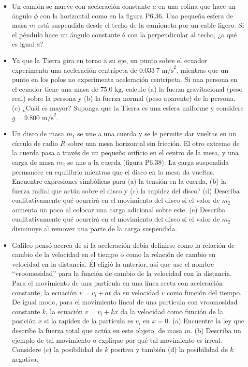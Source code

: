 \documentclass[11pt,a4paper]{article}
\begin{document}
\begin{itemize}
    \item[\textbf{36.}] Un camión se mueve con aceleración constante $a$ en una colina que hace un ángulo $\phi$ con la horizontal como en la figura P6.36. Una pequeña esfera de masa $m$ está suspendida desde el techo de la camioneta por un cable ligero. Si el péndulo hace un ángulo constante $\theta$ con la perpendicular al techo, ¿a qué es igual $a$?
    \vspace*{6cm}

    \item[\textbf{37.}] Ya que la Tierra gira en torno a su eje, un punto sobre el ecuador experimenta una aceleración centrípeta de $0.033\ 7 \text{ m/s}^2$, mientras que un punto en los polos no experimenta aceleración centrípeta. Si una persona en el ecuador tiene una masa de $75.0 \text{ kg}$, calcule (a) la fuerza gravitacional (peso real) sobre la persona y (b) la fuerza normal (peso aparente) de la persona. (c) ¿Cuál es mayor? Suponga que la Tierra es una esfera uniforme y considere $g = 9.800 \text{ m/s}^2$.
    \vspace*{7cm}

    \item[\textbf{38.}] Un disco de masa $m_1$ se une a una cuerda y se le permite dar vueltas en un círculo de radio $R$ sobre una mesa horizontal sin fricción. El otro extremo de la cuerda pasa a través de un pequeño orificio en el centro de la mesa, y una carga de masa $m_2$ se une a la cuerda (figura P6.38). La carga suspendida permanece en equilibrio mientras que el disco en la mesa da vueltas. Encuentre expresiones simbólicas para (a) la tensión en la cuerda, (b) la fuerza radial que actúa sobre el disco y (c) la rapidez del disco? (d) Describa cualitativamente qué ocurrirá en el movimiento del disco si el valor de $m_2$ aumenta un poco al colocar una carga adicional sobre este. (e) Describa cualitativamente qué ocurrirá en el movimiento del disco si el valor de $m_2$ disminuye al remover una parte de la carga suspendida.
    \vspace*{8cm}

    \item[\textbf{39.}] Galileo pensó acerca de si la aceleración debía definirse como la relación de cambio de la velocidad en el tiempo o como la relación de cambio en velocidad en la distancia. Él eligió la anterior, así que use el nombre ``vroomosidad'' para la función de cambio de la velocidad con la distancia. Para el movimiento de una partícula en una línea recta con aceleración constante, la ecuación $v = v_i + at$ da su velocidad $v$ como función del tiempo. De igual modo, para el movimiento lineal de una partícula con vroomosidad constante $k$, la ecuación $v = v_i + kx$ da la velocidad como función de la posición $x$ si la rapidez de la partícula es $v_i$ en $x = 0$. (a) Encuentre la ley que describe la fuerza total que actúa en este objeto, de masa $m$. (b) Describa un ejemplo de tal movimiento o explique por qué tal movimiento es irreal. Considere (c) la posibilidad de $k$ positiva y también (d) la posibilidad de $k$ negativa.
    \vspace*{8cm}
\end{itemize}
\end{document}
